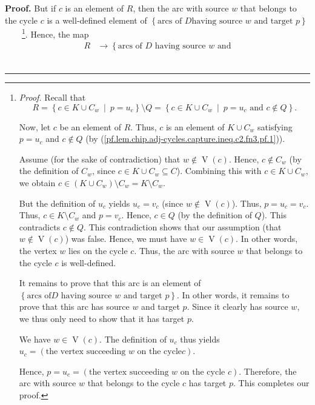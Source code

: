 \documentclass[numbers=enddot,12pt,final,onecolumn,notitlepage]{scrartcl}%
\theoremstyle{definition}
\newenvironment{proof}[1][Proof]{\noindent\textbf{#1.} }{\ \rule{0.5em}{0.5em}}
\begin{document}
\begin{proof}
But if $c$ is an element of $R$, then the arc with source $w$ that belongs to
the cycle $c$ is a well-defined element of $\left\{  \text{arcs of }D\text{
having source }w\text{ and target }p\right\}  $%
\ \ \ \ \footnote{\textit{Proof.} Recall that%
\begin{equation}
R=\left\{  c\in K\cup C_{w}\ \mid\ p=u_{c}\right\}  \setminus Q=\left\{  c\in
K\cup C_{w}\ \mid\ p=u_{c}\text{ and }c\notin Q\right\}
.\label{pf.lem.chip.adj-cycles.capture.ineq.c2.fn3.pf.1}%
\end{equation}
\par
Now, let $c$ be an element of $R$. Thus, $c$ is an element of $K\cup C_{w}$
satisfying $p=u_{c}$ and $c\notin Q$ (by
(\ref{pf.lem.chip.adj-cycles.capture.ineq.c2.fn3.pf.1})).
\par
Assume (for the sake of contradiction) that $w\notin\operatorname*{V}\left(
c\right)  $. Hence, $c\notin C_{w}$ (by the definition of $C_{w}$, since $c\in
K\cup C_{w}\subseteq C$). Combining this with $c\in K\cup C_{w}$, we obtain
$c\in\left(  K\cup C_{w}\right)  \setminus C_{w}=K\setminus C_{w}$.
\par
But the definition of $u_{c}$ yields $u_{c}=v_{c}$ (since $w\notin%
\operatorname*{V}\left(  c\right)  $). Thus, $p=u_{c}=v_{c}$. Thus, $c\in
K\setminus C_{w}$ and $p=v_{c}$. Hence, $c\in Q$ (by the definition of $Q$).
This contradicts $c\notin Q$. This contradiction shows that our assumption
(that $w\notin\operatorname*{V}\left(  c\right)  $) was false. Hence, we must
have $w\in\operatorname*{V}\left(  c\right)  $. In other words, the vertex $w$
lies on the cycle $c$. Thus, the arc with source $w$ that belongs to the cycle
$c$ is well-defined.
\par
It remains to prove that this arc is an element of $\left\{  \text{arcs of
}D\text{ having source }w\text{ and target }p\right\}  $. In other words, it
remains to prove that this arc has source $w$ and target $p$. Since it clearly
has source $w$, we thus only need to show that it has target $p$.
\par
We have $w\in\operatorname*{V}\left(  c\right)  $. The definition of $u_{c}$
thus yields $u_{c}=\left(  \text{the vertex succeeding }w\text{ on the cycle
}c\right)  $.
\par
Hence, $p=u_{c}=\left(  \text{the vertex succeeding }w\text{ on
the cycle }c\right)  $. Therefore, the arc with source $w$ that belongs to the
cycle $c$ has target $p$. This completes our proof.}. Hence, the map%
\begin{align*}
R &  \rightarrow\left\{  \text{arcs of }D\text{ having source }w\text{ and
}
\end{align*}
\end{proof}
\end{document}
